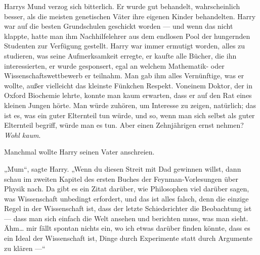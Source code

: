 Harrys Mund verzog sich bitterlich. Er wurde gut behandelt, wahrscheinlich besser, als die meisten genetischen Väter ihre eigenen Kinder behandelten. Harry war auf die besten Grundschulen geschickt worden — und wenn das nicht klappte, hatte man ihm Nachhilfelehrer aus dem endlosen Pool der hungernden Studenten zur Verfügung gestellt. Harry war immer ermutigt worden, alles zu studieren, was seine Aufmerksamkeit erregte, er kaufte alle Bücher, die ihn interessierten, er wurde gesponsert, egal an welchem Mathematik- oder Wissenschaftswettbewerb er teilnahm. Man gab ihm alles Vernünftige, was er wollte, außer vielleicht das kleinste Fünkchen Respekt. Voneinem Doktor, der in Oxford Biochemie lehrte, konnte man kaum erwarten, dass er auf den Rat eines kleinen Jungen hörte. Man würde zuhören, um Interesse zu zeigen, natürlich; das ist es, was ein guter Elternteil tun würde, und so, wenn man sich selbst als guter Elternteil begriff, würde man es tun. Aber einen Zehnjährigen ernst nehmen? \emph{Wohl kaum}.

Manchmal wollte Harry seinen Vater anschreien.

„Mum“, sagte Harry. „Wenn du diesen Streit mit Dad gewinnen willst, dann schau im zweiten Kapitel des ersten Buches der Feynman-Vorlesungen über Physik nach. Da gibt es ein Zitat darüber, wie Philosophen viel darüber sagen, was Wissenschaft unbedingt erfordert, und das ist alles falsch, denn die einzige Regel in der Wissenschaft ist, dass der letzte Schiedsrichter die Beobachtung ist — dass man sich einfach die Welt ansehen und berichten muss, was man sieht. Ähm… mir fällt spontan nichts ein, wo ich etwas darüber finden könnte, dass es ein Ideal der Wissenschaft ist, Dinge durch Experimente statt durch Argumente zu klären —“

